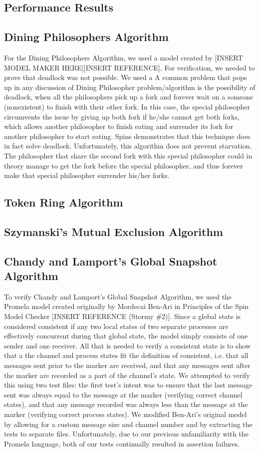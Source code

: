 \documentclass[12pt]{article}
\begin{document}
\begin{flushleft}
\section{Performance Results}
\subsection{Dining Philosophers Algorithm}
For the Dining Philosophers Algorithm, we used a model created by [INSERT MODEL MAKER HERE][INSERT REFERENCE]. For verification, we needed to prove that deadlock was not possible. We used a 
A common problem that pops up in any discussion of Dining Philosopher problem/algorithm is the possibility of deadlock, when all the philosophers pick up a fork and forever wait on a someone (nonexistent) to finish with their other fork. In this case, the special philosopher circumvents the issue by giving up both fork if he/she cannot get both forks, which allows another philosopher to finish eating and surrender its fork for another philosopher to start eating. Spins demonstrates that this technique does in fact solve deadlock.
Unfortunately, this algorithm does not prevent starvation. The philosopher that share the second fork with this special philosopher could in theory manage to get the fork before the special philosopher, and thus forever make that special philosopher surrender his/her forks.
\subsection{Token Ring Algorithm}
\subsection{Szymanski's Mutual Exclusion Algorithm}
\subsection{Chandy and Lamport's Global Snapshot Algorithm}
To verify Chandy and Lamport's Global Snapshot Algorithm, we used the Promela model created originally by Mordecai Ben-Ari in Principles of the Spin Model Checker [INSERT REFERENCE (Stormy \#2)]. Since a global state is considered consistent if any two local states of two separate processes are effectively concurrent during that global state, the model simply consists of one sender and one receiver. All that is needed to verify a consistent state is to show that a the channel and process states fit the definition of consistent, i.e. that all messages sent prior to the marker are received, and that any messages sent after the marker are recorded as a part of the channel's state. We attempted to verify this using two test files: the first test's intent was to ensure that the last message sent was always equal to the message at the marker (verifying correct channel states), and that any message recorded was always less than the message at the marker (verifying correct process states). We modified Ben-Ari's original model by allowing for a custom message size and channel number and by extracting the tests to separate files. Unfortunately, due to our previous unfamiliarity with the Promela language, both of our tests continually resulted in assertion failures.


\end{flushleft}
\end{document}
